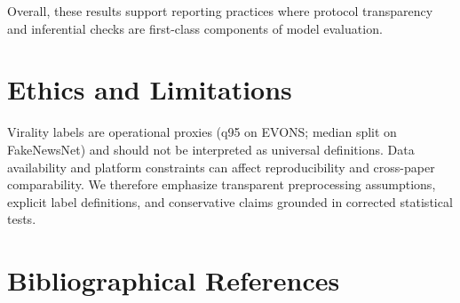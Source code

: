 \documentclass[10pt, a4paper]{article}
\begin{document}
Overall, these results support reporting practices where protocol transparency and inferential checks are first-class components of model evaluation.

\section*{Ethics and Limitations}
Virality labels are operational proxies (q95 on EVONS; median split on FakeNewsNet) and should not be interpreted as universal definitions. Data availability and platform constraints can affect reproducibility and cross-paper comparability. We therefore emphasize transparent preprocessing assumptions, explicit label definitions, and conservative claims grounded in corrected statistical tests.

\section{Bibliographical References}\label{sec:reference}


\end{document}

